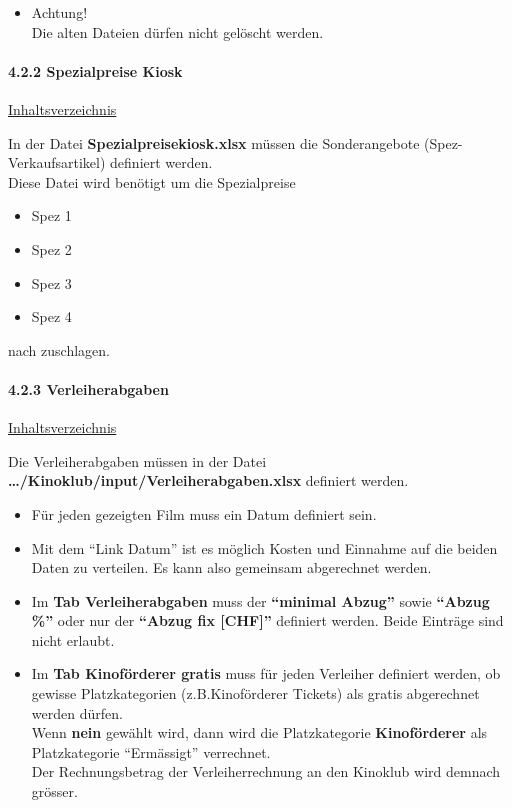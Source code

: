 \documentclass[
]{article}
\providecommand{\tightlist}{%
  \setlength{\itemsep}{0pt}\setlength{\parskip}{0pt}}
\begin{document}
\begin{itemize}
\tightlist
\item
  Achtung!\\
  Die alten Dateien dürfen nicht gelöscht werden.
\end{itemize}

\paragraph{4.2.2 Spezialpreise Kiosk}\label{spezialpreise-kiosk}

\hyperref[Inhaltsverzeichnis]{Inhaltsverzeichnis}

In der Datei \textbf{Spezialpreisekiosk.xlsx} müssen die Sonderangebote
(Spez-Verkaufsartikel) definiert werden.\\
Diese Datei wird benötigt um die Spezialpreise

\begin{itemize}
\tightlist
\item
  Spez 1
\item
  Spez 2
\item
  Spez 3
\item
  Spez 4
\end{itemize}

nach zuschlagen.

\paragraph{4.2.3 Verleiherabgaben}\label{verleiherabgaben}

\hyperref[Inhaltsverzeichnis]{Inhaltsverzeichnis}

Die Verleiherabgaben müssen in der Datei
\textbf{\ldots/Kinoklub/input/Verleiherabgaben.xlsx} definiert werden.\\

\begin{itemize}
\tightlist
\item
  Für jeden gezeigten Film muss ein Datum definiert sein.
\item
  Mit dem ``Link Datum'' ist es möglich Kosten und Einnahme auf die
  beiden Daten zu verteilen. Es kann also gemeinsam abgerechnet werden.
\item
  Im \textbf{Tab Verleiherabgaben} muss der \textbf{``minimal Abzug''}
  sowie \textbf{``Abzug \%''} oder nur der \textbf{``Abzug fix
  {[}CHF{]}''} definiert werden. Beide Einträge sind nicht erlaubt.
\item
  Im \textbf{Tab Kinoförderer gratis} muss für jeden Verleiher definiert
  werden, ob gewisse Platzkategorien (z.B.Kinoförderer Tickets) als
  gratis abgerechnet werden dürfen.\\
  Wenn \textbf{nein} gewählt wird, dann wird die Platzkategorie
  \textbf{Kinoförderer} als Platzkategorie ``Ermässigt'' verrechnet.\\
  Der Rechnungsbetrag der Verleiherrechnung an den Kinoklub wird demnach
  grösser.
\end{itemize}
\end{document}
